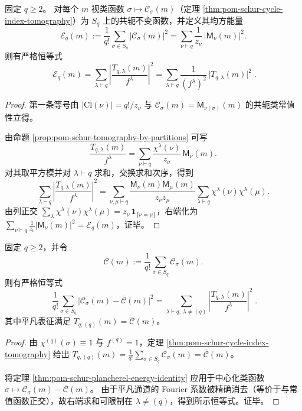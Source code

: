 \begin{theorem}\label{thm:pom-schur-plancherel-energy-identity}
固定 \(q\ge 2\)。
对每个 \(m\) 视类函数 \(\sigma\mapsto \mathcal{C}_\sigma(m)\)（定理 \ref{thm:pom-schur-cycle-index-tomography}）为 \(S_q\) 上的共轭不变函数，并定义其均方能量
\[
\mathcal{E}_q(m):=\frac{1}{q!}\sum_{\sigma\in S_q}\bigl|\mathcal{C}_\sigma(m)\bigr|^2
=\sum_{\nu\vdash q}\frac{1}{z_\nu}\,\bigl|\mathsf{M}_\nu(m)\bigr|^2.
\]
则有严格恒等式
\[
\boxed{\;
\mathcal{E}_q(m)=\sum_{\lambda\vdash q}\left|\frac{T_{q,\lambda}(m)}{f^\lambda}\right|^2
=\sum_{\lambda\vdash q}\frac{1}{(f^\lambda)^2}\,\bigl|T_{q,\lambda}(m)\bigr|^2\; }.
\]
\end{theorem}
\begin{proof}
第一条等号由 \(|\mathrm{Cl}(\nu)|=q!/z_\nu\) 与 \(\mathcal{C}_\sigma(m)=\mathsf{M}_{\nu(\sigma)}(m)\) 的共轭类常值性立得。
\par
由命题 \ref{prop:pom-schur-tomography-by-partitions} 可写
\[
\frac{T_{q,\lambda}(m)}{f^\lambda}
=\sum_{\nu\vdash q}\frac{\chi^\lambda(\nu)}{z_\nu}\,\mathsf{M}_\nu(m).
\]
对其取平方模并对 \(\lambda\vdash q\) 求和，交换求和次序，得到
\[
\sum_{\lambda\vdash q}\left|\frac{T_{q,\lambda}(m)}{f^\lambda}\right|^2
=\sum_{\nu,\mu\vdash q}\frac{\mathsf{M}_\nu(m)\overline{\mathsf{M}_\mu(m)}}{z_\nu z_\mu}
\sum_{\lambda\vdash q}\chi^\lambda(\nu)\chi^\lambda(\mu).
\]
由列正交 \(\sum_{\lambda}\chi^\lambda(\nu)\chi^\lambda(\mu)=z_\nu\,\mathbf 1_{\{\nu=\mu\}}\)，右端化为
\(
\sum_{\nu\vdash q}\frac{1}{z_\nu}|\mathsf{M}_\nu(m)|^2=\mathcal E_q(m)
\)，证毕。
\end{proof}

\begin{theorem}\label{thm:pom-schur-variance-decomposition}
固定 \(q\ge 2\)，并令
\[
\overline{\mathcal C}(m):=\frac{1}{q!}\sum_{\sigma\in S_q}\mathcal{C}_\sigma(m).
\]
则有严格恒等式
\[
\boxed{\;
\frac{1}{q!}\sum_{\sigma\in S_q}\bigl|\mathcal{C}_\sigma(m)-\overline{\mathcal C}(m)\bigr|^2
=\sum_{\lambda\vdash q,\ \lambda\ne(q)}\left|\frac{T_{q,\lambda}(m)}{f^\lambda}\right|^2\; }.
\]
其中平凡表征满足 \(T_{q,(q)}(m)=\overline{\mathcal C}(m)\)。
\end{theorem}
\begin{proof}
由 \(\chi^{(q)}(\sigma)\equiv 1\) 与 \(f^{(q)}=1\)，定理 \ref{thm:pom-schur-cycle-index-tomography} 给出
\(
T_{q,(q)}(m)=\frac{1}{q!}\sum_{\sigma\in S_q}\mathcal C_\sigma(m)=\overline{\mathcal C}(m)
\)。
\par
将定理 \ref{thm:pom-schur-plancherel-energy-identity} 应用于中心化类函数
\(\sigma\mapsto \mathcal C_\sigma(m)-\overline{\mathcal C}(m)\)。
由于平凡通道的 Fourier 系数被精确消去（等价于与常值函数正交），故右端求和可限制在 \(\lambda\ne(q)\)，得到所示恒等式。证毕。
\end{proof}

